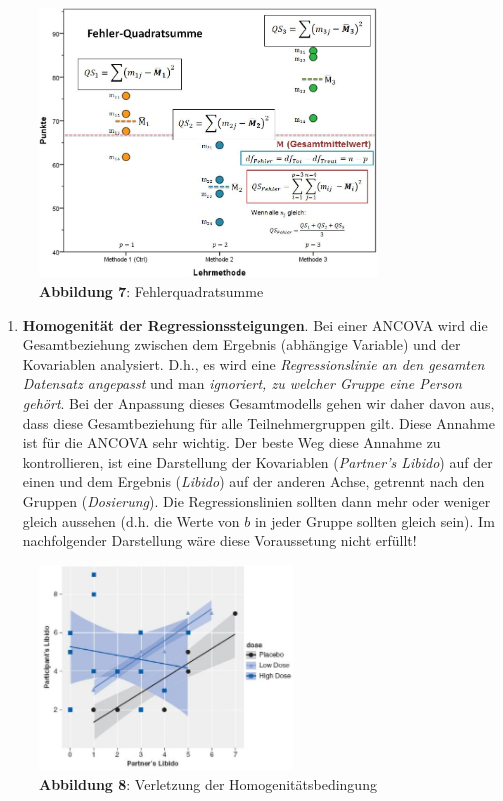 \documentclass[]{article}
\providecommand{\tightlist}{%
  \setlength{\itemsep}{0pt}\setlength{\parskip}{0pt}}
\begin{document}
\begin{figure}
\centering
\includegraphics[width=0.80000\textwidth]{Images/ANOVA_QS_Fehler_Graphisch.jpg}
\caption{\textbf{Abbildung 7}: Fehlerquadratsumme}
\end{figure}

\begin{enumerate}
\def\labelenumi{\arabic{enumi}.}
\setcounter{enumi}{1}
\tightlist
\item
  \textbf{Homogenität der Regressionssteigungen}. Bei einer ANCOVA wird
  die Gesamtbeziehung zwischen dem Ergebnis (abhängige Variable) und der
  Kovariablen analysiert. D.h., es wird eine \emph{Regressionslinie an
  den gesamten Datensatz angepasst} und man \emph{ignoriert, zu welcher
  Gruppe eine Person gehört}. Bei der Anpassung dieses Gesamtmodells
  gehen wir daher davon aus, dass diese Gesamtbeziehung für alle
  Teilnehmergruppen gilt. Diese Annahme ist für die ANCOVA sehr wichtig.
  Der beste Weg diese Annahme zu kontrollieren, ist eine Darstellung der
  Kovariablen (\emph{Partner's Libido}) auf der einen und dem Ergebnis
  (\emph{Libido}) auf der anderen Achse, getrennt nach den Gruppen
  (\emph{Dosierung}). Die Regressionslinien sollten dann mehr oder
  weniger gleich aussehen (d.h. die Werte von \(b\) in jeder Gruppe
  sollten gleich sein). Im nachfolgender Darstellung wäre diese
  Voraussetung nicht erfüllt!
\end{enumerate}

\begin{figure}
\centering
\includegraphics[width=0.60000\textwidth]{Images/Kovarianz_Field_11_3.jpg}
\caption{\textbf{Abbildung 8}: Verletzung der Homogenitätsbedingung}
\end{figure}
\end{document}
